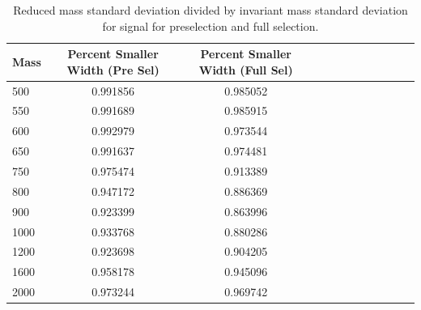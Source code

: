 \begin{table}[h]
\begin{tabular}{|l|c|c|c|c|c|c|c|c|c|c|c|}
\hline
Mass & Percent Smaller Width (Pre Sel) & Percent Smaller Width (Full Sel) \\ \hline
500 & 0.991856 &0.985052 \\
550 & 0.991689 &0.985915 \\
600 & 0.992979 & 0.973544 \\
650 & 0.991637 & 0.974481 \\
750 & 0.975474 & 0.913389 \\
800 & 0.947172 & 0.886369 \\
900 & 0.923399 & 0.863996 \\
1000 & 0.933768 & 0.880286 \\
1200 & 0.923698 & 0.904205 \\
1600 & 0.958178 & 0.945096 \\
2000 & 0.973244 & 0.969742 \\
\hline
\end{tabular}
\caption{Reduced mass standard deviation divided by invariant mass standard deviation for signal for preselection and full selection.}\label{tab:invmredm}
\end{table}

